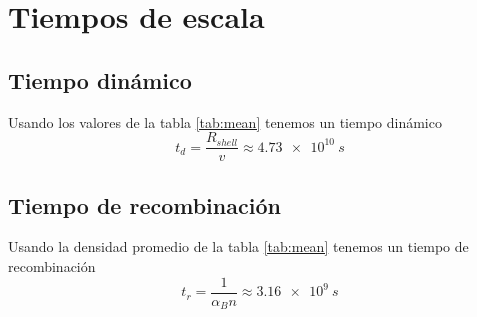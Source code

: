 \documentclass{book}
\begin{document}
\chapter{Tiempos de escala}

\section{Tiempo dinámico}

Usando los valores de la tabla \ref{tab:mean} tenemos un tiempo dinámico \[t_d = \frac{R_{shell}}{v} \approx \SI{4.73e10}{s}\]

\section{Tiempo de recombinación}

Usando la densidad promedio de la tabla \ref{tab:mean} tenemos un tiempo de recombinación 
\[t_r = \frac{1}{\alpha_B n} \approx \SI{3.16e9}{s}\]


\end{document}
